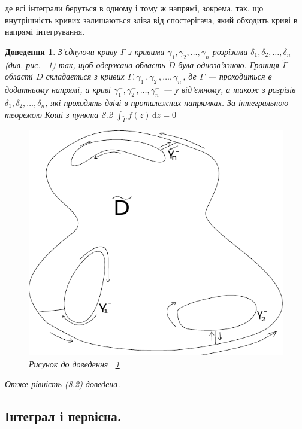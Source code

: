 \documentclass[12pt,fleqn]{article}
\theoremstyle{theorem}
\theoremstyle{proof}
\newtheorem*{dov}{Доведення}
\numberwithin{figure}{section}
\numberwithin{equation}{section}
\begin{document}
де всі інтеграли беруться в одному і тому ж напрямі, зокрема, так, що внутрішність кривих залишаються зліва від спостерігача, який обходить криві в напрямі інтегрування.

\begin{dov}\label{dov.8.4.1}
З'єднуючи криву $\Gamma$ з кривими $\gamma_1, \gamma_2, \ldots, \gamma_n$ розрізами $\delta_1, \delta_2, \ldots, \delta_n$ (див. рис. ~\ref{fig.8.4.1}) так, щоб одержана область $\widetilde{D}$ була однозв'язною. Границя $\widetilde{\Gamma}$ області $D$ складається з кривих $\Gamma, \gamma_1^{-}, \gamma_2^{-}, \ldots, \gamma_n^{-}$, де $\Gamma$ --- проходиться в додатньому напрямі, а криві $\gamma_1^{-}, \gamma_2^{-}, \ldots, \gamma_n^{-}$ --- у від'ємному, а також з розрізів $\delta_1, \delta_2, \ldots, \delta_n$, які проходять двічі в протилежних напрямках. За інтегральною теоремою Коші з пункта 8.2 $\int_{\widetilde{\Gamma}}f(z)\,\mathrm{d}z=0$
\begin{figure}
  \centering
  \includegraphics{fig1}
  \caption{Рисунок до доведення ~\ref{dov.8.4.1}}\label{fig.8.4.1}
\end{figure}

Отже рівність (8.2) доведена.
\end{dov}

\newpage

\subsection{Інтеграл і первісна.}\label{8.5}\allowdisplaybreaks
\end{document}
